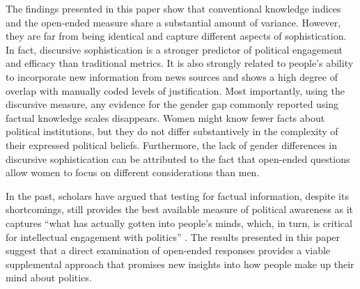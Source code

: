 The findings presented in this paper show that conventional knowledge indices and the open-ended measure share a substantial amount of variance. However, they are far from being identical and capture different aspects of sophistication. In fact, discursive sophistication is a stronger predictor of political engagement and efficacy than traditional metrics. It is also strongly related to people's ability to incorporate new information from news sources and shows a high degree of overlap with manually coded levels of justification. Most importantly, using the discursive measure, any evidence for the gender gap commonly reported using factual knowledge scales disappears. Women might know fewer facts about political institutions, but they do not differ substantively in the complexity of their expressed political beliefs. Furthermore, the lack of gender differences in discursive sophistication can be attributed to the fact that open-ended questions allow women to focus on different considerations than men.

In the past, scholars have argued that testing for factual information, despite its shortcomings, still provides the best available measure of political awareness as it captures ``what has actually gotten into people's minds, which, in turn, is critical for intellectual engagement with politics'' \citet[21]{zaller1992nature}. The results presented in this paper suggest that a direct examination of open-ended responses provides a viable supplemental approach that promises new insights into how people make up their mind about politics.

\clearpage
\singlespacing

